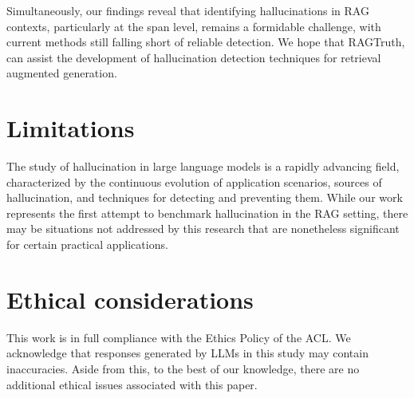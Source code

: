 \documentclass[11pt]{article}
\newcommand{\CorpusName}{RAGTruth}
\begin{document}
Simultaneously, our findings reveal that identifying hallucinations in RAG contexts, particularly at the span level, remains a formidable challenge, with current methods still falling short of reliable detection. 
We hope that {\CorpusName}, 
can assist the development of hallucination detection techniques for retrieval augmented generation. 


\section{Limitations}

The study of hallucination in large language models is a rapidly advancing field, characterized by the continuous evolution of application scenarios, sources of hallucination, and techniques for detecting and preventing them. While our work represents the first attempt to benchmark hallucination in the RAG setting, there may be situations not addressed by this research that are nonetheless significant for certain practical applications.

\section{Ethical considerations}
This work is in full compliance with the Ethics Policy of the ACL. 
We acknowledge that responses generated by LLMs in this study may contain inaccuracies. 
Aside from this, to the best of our knowledge, there are no additional ethical issues associated with this paper.
\end{document}
